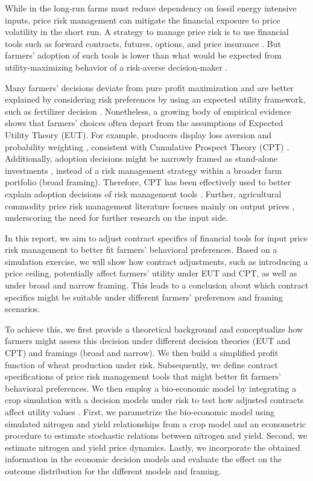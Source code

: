 \documentclass[12pt,a4paper]{article}
\begin{document}
While in the long-run farms must reduce dependency on fossil energy intensive inputs, price risk management can mitigate the financial exposure to price volatility in the short run. A strategy to manage price risk is to use financial tools such as forward contracts, futures, options, and price insurance \citep{Hardaker2015}. But farmers' adoption of such tools is lower than what would be expected from utility-maximizing behavior of a risk-averse decision-maker \citep{Spada2025}.

Many farmers' decisions deviate from pure profit maximization and are better explained by considering risk preferences by using an expected utility framework, such as fertilizer decision \citep{Moritz2025}. Nonetheless, a growing body of empirical evidence shows that farmers' choices often depart from the assumptions of Expected Utility Theory (EUT). For example, producers display loss aversion and probability weighting \citep{Finger2024}, consistent with Cumulative Prospect Theory (CPT) \citep{TverskyKahneman1992}. Additionally, adoption decisions might be narrowly framed as stand-alone investments \citep{Barberis2006}, instead of a risk management strategy within a broader farm portfolio (broad framing). Therefore, CPT has been effectively used to better explain adoption decisions of risk management tools \citep{Mattos2008, Babcock2015}. Further, agricultural commodity price risk management literature focuses mainly on output prices \citep{Spada2025}, underscoring the need for further research on the input side.

In this report, we aim to adjust contract specifics of financial tools for input price risk management to better fit farmers' behavioral preferences. Based on a simulation exercise, we will show how contract adjustments, such as introducing a price ceiling, potentially affect farmers' utility under EUT and CPT, as well as under broad and narrow framing. This leads to a conclusion about which contract specifics might be suitable under different farmers' preferences and framing scenarios.

To achieve this, we first provide a theoretical background and conceptualize how farmers might assess this decision under different decision theories (EUT and CPT) and framings (broad and narrow). We then build a simplified profit function of wheat production under risk. Subsequently, we define contract specifications of price risk management tools that might better fit farmers' behavioral preferences. We then employ a bio-economic model by integrating a crop simulation with a decision models under risk to test how adjusted contracts affect utility values \citep{Finger2012}. First, we parametrize the bio-economic model using simulated nitrogen and yield relationships from a crop model and an econometric procedure to estimate stochastic relations between nitrogen and yield. Second, we estimate nitrogen and yield price dynamics. Lastly, we incorporate the obtained information in the economic decision models and evaluate the effect on the outcome distribution for the different models and framing.
\end{document}
